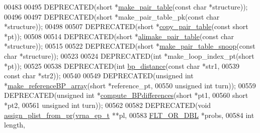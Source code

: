 \begin{DoxyCode}
00483 
00495 DEPRECATED(\textcolor{keywordtype}{short} *\hyperlink{group__struct__utils_ga89c32307ee50a0026f4a3131fac0845a}{make\_pair\_table}(\textcolor{keyword}{const} \textcolor{keywordtype}{char} *structure));
00496 
00497 DEPRECATED(\textcolor{keywordtype}{short} *make\_pair\_table\_pk(\textcolor{keyword}{const} \textcolor{keywordtype}{char} *structure));
00498 
00507 DEPRECATED(\textcolor{keywordtype}{short} *\hyperlink{group__struct__utils_gafeaa6d68eef3a99d0a7aa08aa91c6601}{copy\_pair\_table}(\textcolor{keyword}{const} \textcolor{keywordtype}{short} *pt));
00508 
00514 DEPRECATED(\textcolor{keywordtype}{short} *\hyperlink{group__struct__utils_ga3c81b3967056c3888b8472b65fbb16f5}{alimake\_pair\_table}(\textcolor{keyword}{const} \textcolor{keywordtype}{char} *structure));
00515 
00522 DEPRECATED(\textcolor{keywordtype}{short} *\hyperlink{group__struct__utils_ga9aa3bf3b4346bb7fb88efc154dd07a79}{make\_pair\_table\_snoop}(\textcolor{keyword}{const} \textcolor{keywordtype}{char} *structure));
00523 
00524 DEPRECATED(\textcolor{keywordtype}{int} *make\_loop\_index\_pt(\textcolor{keywordtype}{short} *pt));
00525 
00538 DEPRECATED(\textcolor{keywordtype}{int} \hyperlink{group__struct__utils_ga6ebbcd29a754f0e4f1a66d1fd84184db}{bp\_distance}(\textcolor{keyword}{const} \textcolor{keywordtype}{char} *str1,
00539                            \textcolor{keyword}{const} \textcolor{keywordtype}{char} *str2));
00540 
00549 DEPRECATED(\textcolor{keywordtype}{unsigned} \textcolor{keywordtype}{int} *\hyperlink{group__struct__utils_ga578cd9712dee812fb1c58aa3cc489864}{make\_referenceBP\_array}(\textcolor{keywordtype}{short}         *reference\_pt,
00550                                                 \textcolor{keywordtype}{unsigned} \textcolor{keywordtype}{int}  turn));
00559 DEPRECATED(\textcolor{keywordtype}{unsigned} \textcolor{keywordtype}{int} *\hyperlink{group__struct__utils_gadd463184355d0803b6ee6e09f29182f2}{compute\_BPdifferences}(\textcolor{keywordtype}{short}        *pt1,
00560                                                \textcolor{keywordtype}{short}        *pt2,
00561                                                \textcolor{keywordtype}{unsigned} \textcolor{keywordtype}{int} turn));
00562 
00582 DEPRECATED(\textcolor{keywordtype}{void}  \hyperlink{group__pf__fold_ga1cc05aaa9b0e7df2d3887e98321c2030}{assign\_plist\_from\_pr}(\hyperlink{group__struct__utils_structvrna__elem__prob__s}{vrna\_ep\_t}   **pl,
00583                                       \hyperlink{group__data__structures_ga31125aeace516926bf7f251f759b6126}{FLT\_OR\_DBL}  *probs,
00584                                       \textcolor{keywordtype}{int}         length,

\end{DoxyCode}
